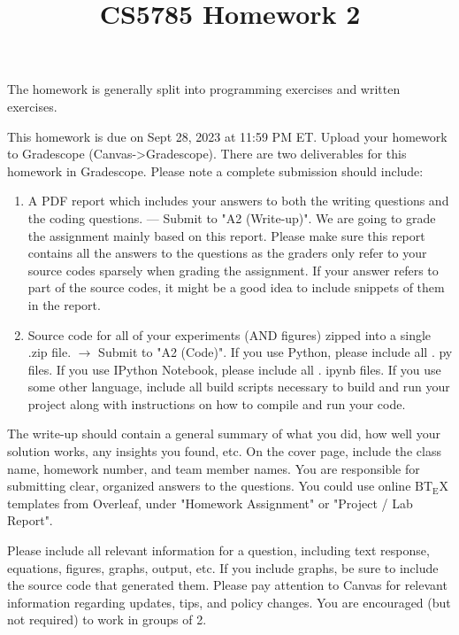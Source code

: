 \documentclass[10pt]{article}
\title{CS5785 Homework 2 }
\author{}
\date{}
\begin{document}
\maketitle
The homework is generally split into programming exercises and written exercises.

This homework is due on Sept 28, 2023 at 11:59 PM ET. Upload your homework to Gradescope (Canvas->Gradescope). There are two deliverables for this homework in Gradescope. Please note a complete submission should include:

\begin{enumerate}
  \item A PDF report which includes your answers to both the writing questions and the coding questions. — Submit to "A2 (Write-up)". We are going to grade the assignment mainly based on this report. Please make sure this report contains all the answers to the questions as the graders only refer to your source codes sparsely when grading the assignment. If your answer refers to part of the source codes, it might be a good idea to include snippets of them in the report.

  \item Source code for all of your experiments (AND figures) zipped into a single .zip file. $\longrightarrow$ Submit to "A2 (Code)". If you use Python, please include all . py files. If you use IPython Notebook, please include all . ipynb files. If you use some other language, include all build scripts necessary to build and run your project along with instructions on how to compile and run your code.

\end{enumerate}

The write-up should contain a general summary of what you did, how well your solution works, any insights you found, etc. On the cover page, include the class name, homework number, and team member names. You are responsible for submitting clear, organized answers to the questions. You could use online $\mathrm{BT}_{\mathrm{E}} \mathrm{X}$ templates from Overleaf, under "Homework Assignment" or "Project / Lab Report".

Please include all relevant information for a question, including text response, equations, figures, graphs, output, etc. If you include graphs, be sure to include the source code that generated them. Please pay attention to Canvas for relevant information regarding updates, tips, and policy changes. You are encouraged (but not required) to work in groups of 2.
\end{document}
